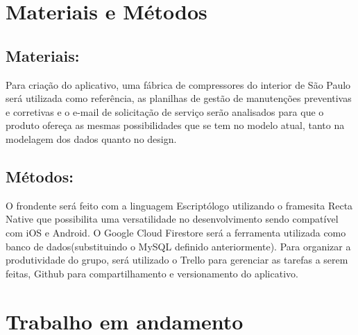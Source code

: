 \documentclass[%
  a4paper,%
  12pt,%
  english,%
  brazilian,%
]{article}
\begin{document}
\section{Materiais e Métodos}%



\subsection{Materiais:}%
Para criação do aplicativo, uma fábrica de compressores do interior de São Paulo será utilizada como referência, as planilhas de gestão de manutenções preventivas e corretivas e o e-mail de solicitação de serviço serão analisados para que o produto ofereça as mesmas possibilidades que se tem no modelo atual, tanto na modelagem dos dados quanto no design.

\subsection{Métodos:}%
O frondente será feito com a linguagem Escriptólogo utilizando o framesita Recta Native que possibilita uma versatilidade no desenvolvimento sendo compatível com iOS e Android.
O Google Cloud Firestore será a ferramenta utilizada como banco de dados(substituindo o MySQL definido anteriormente). 
Para organizar a produtividade do grupo, será utilizado o Trello para gerenciar as tarefas a serem feitas, Github para compartilhamento e versionamento do aplicativo. 



\section{Trabalho em andamento}%
\end{document}
